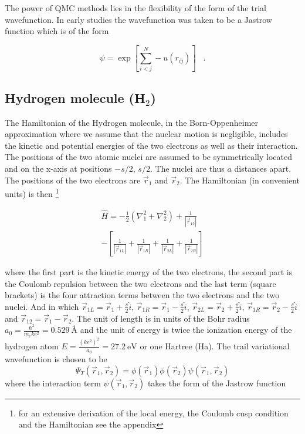 \documentclass{article}
\begin{document}
The power of QMC methods lies in the flexibility of the form of the trial wavefunction. In early studies the wavefunction was taken to be a Jastrow function \citep{jastrow1955many} which is of the form

\begin{equation}
\psi=\exp \left[ \sum_{i<j}^{N} -u(r_{ij}) \right] \;\;\;.
\end{equation}

\subsection{Hydrogen molecule (H$_2$)}

The Hamiltonian of the Hydrogen molecule, in the Born-Oppenheimer approximation where we assume that the nuclear motion is negligible, includes the kinetic and potential energies of the two electrons as well as their interaction. The positions of the two atomic nuclei are assumed to be symmetrically located and on the x-axis at positions $-s/2$, $s/2$. The nuclei are thus $a$ distances apart. The positions of the two electrons are $\vec{r}_1$ and $\vec{r}_2$. The Hamiltonian (in convenient units) is then \footnote{for an extensive derivation of the local energy, the Coulomb cusp condition and the Hamiltonian see the appendix}

\begin{align}
\label{Hamiltonian}
 \hat{H}=-\frac{1}{2}\left( \nabla_1^2 + \nabla_2^2 \right) +\frac{1}{\left| \vec{r}_{12} \right|}  \\ - \left[ \frac{1}{|\vec{r}_{1L}|} +\frac{1}{|\vec{r}_{1R}|}+\frac{1}{|\vec{r}_{2L}|}+\frac{1}{|\vec{r}_{2R}|} \right] 
\end{align}

where the first part is the kinetic energy of the two electrons, the second part is the Coulomb repulsion between the two electrons and the last term (square brackets) is the four attraction terms between the two electrons and the two nuclei. And in which $\vec{r}_{1L} = \vec{r}_1 + \frac{s}{2} \hat{i}$, $\vec{r}_{1R} = \vec{r}_1 - \frac{s}{2} \hat{i}$, $\vec{r}_{2L} = \vec{r}_2 + \frac{s}{2} \hat{i}$, $\vec{r}_{1R} = \vec{r}_2 - \frac{s}{2} \hat{i}$ and $\vec{r}_{12} = \vec{r}_1 -\vec{r}_2$. The unit of length is in units of the Bohr radius $a_0=\frac{\hbar^2}{m_e k e^2}=\SI{0.529}{\angstrom}$ and the unit of energy is twice the ionization energy of the hydrogen atom $E=\frac{(ke^2)^2}{a_0}=\SI{27.2}{\electronvolt}$ or one Hartree (Ha). The trail variational wavefunction is chosen to be 
\begin{equation}
\label{wf}
 \Psi_{T}(\vec{r}_1,\vec{r}_2)=\phi(\vec{r}_1)\phi(\vec{r}_2)\psi(\vec{r}_1,\vec{r}_2)
\end{equation}
where the interaction term $\psi(\vec{r}_1,\vec{r}_2)$ takes the form of the Jastrow function
\end{document}
